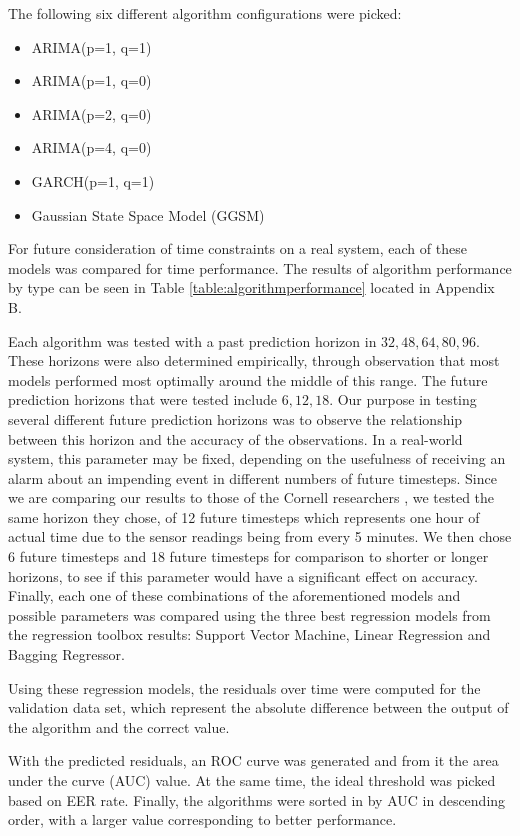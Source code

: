\documentclass{acm_proc_article-sp}
\begin{document}
The following six different algorithm configurations were picked: 
\begin{itemize}
\item ARIMA(p=1, q=1)
\item ARIMA(p=1, q=0)
\item ARIMA(p=2, q=0)
\item ARIMA(p=4, q=0)
\item GARCH(p=1, q=1)
\item Gaussian State Space Model (GGSM)
\end{itemize}

For future consideration of time constraints on a real system, each of these models was compared for time performance. The results of algorithm performance by type can be seen in Table \ref{table:algorithmperformance} located in Appendix B.

Each algorithm was tested with a past prediction horizon in ${32, 48, 64, 80, 96}$. These horizons were also determined empirically, through observation that most models performed most optimally around the middle of this range. The future prediction horizons that were tested include ${6, 12, 18}$.
Our purpose in testing several different future prediction horizons was to observe the relationship between this horizon and the accuracy of the observations. In a real-world system, this parameter may be fixed, depending on the usefulness of receiving an alarm about an impending event in different numbers of future timesteps. Since we are comparing our results to those of the Cornell researchers \cite{Cornell}, we tested the same horizon they chose, of 12 future timesteps which represents one hour of actual time due to the sensor readings being from every 5 minutes. We then chose 6 future timesteps and 18 future timesteps for comparison to shorter or longer horizons, to see if this parameter would have a significant effect on accuracy. Finally, each one of these combinations of the aforementioned models and possible parameters was compared using the
three best regression models from the regression toolbox results: Support Vector Machine, Linear Regression and Bagging Regressor. 

Using these regression models, the residuals over time were computed for the validation data set, which represent the absolute difference between the output of the algorithm and the correct value.

With the predicted residuals, an ROC curve was generated and from it the area under the curve (AUC) value. At the same time,
the ideal threshold was picked based on EER rate. Finally, the algorithms were sorted in by AUC in descending order, with a larger value corresponding to better performance.
\end{document}
